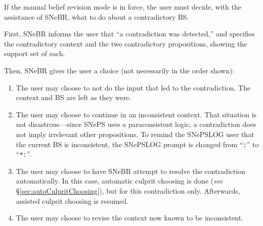 \documentclass{book}
\begin{document}
If the manual belief revision mode is in force, the user must decide, with the
assistance of SNeBR, what to do about a contradictory BS.

First, SNeBR informs the user that ``a contradiction was detected,'' and
specifies the contradictory context and the two contradictory
propositions, showing the support set of each.

Then, SNeBR gives the user a choice (not necessarily in the order shown):
\begin{enumerate}
\item The user may choose to not do the input that led to the
  contradiction.  The context and BS are left as they were.
\item The user may choose to continue in an inconsistent context.  That
  situation is not disastrous---since SNePS uses a paraconsistent logic, a
  contradiction does not imply irrelevant other propositions.  To remind the
  SNePSLOG user that the current BS is inconsistent, the SNePSLOG prompt is
  changed from ``\texttt{:}'' to ``\texttt{*:}''.

\item The user may choose to have SNeBR attempt to resolve the contradiction
  automatically.  In this case, automatic culprit choosing is done (\emph{see}
  \S \ref{sec:autoCulpritChoosing}), but for this contradiction only.
  Afterwards, assisted culprit choosing is resumed.

\item The user may choose to revise the context now known to be
  inconsistent.
\end{enumerate}
\end{document}
